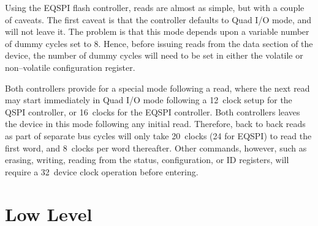 \documentclass{gqtekspec}
\begin{document}
Using the EQSPI flash controller, reads are almost as simple, but with a couple
of caveats.  The first caveat is that the controller defaults to Quad I/O mode,
and will not leave it.  The problem is that this mode depends upon a variable
number of dummy cycles set to 8.  Hence, before issuing reads from the data
section of the device, the number of dummy cycles will need to be set in either
the volatile or non--volatile configuration register.



Both controllers provide for a special mode following a read, where the
next read may start immediately in Quad I/O mode following a 12~clock
setup for the QSPI controller, or 16~clocks for the EQSPI controller.  Both
controllers leaves the device in this mode following any initial
read.  Therefore, back to back reads as part of separate bus cycles will only
take 20~clocks (24 for EQSPI) to read the first word, and 8~clocks per word
thereafter.  Other commands, however, such as erasing, writing, reading from
the status, configuration, or ID registers, will require a 32~device
clock operation before entering.

\section{Low Level}
\end{document}
